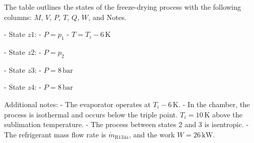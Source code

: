 The table outlines the states of the freeze-drying process with the following columns: \( M \), \( V \), \( P \), \( T \), \( Q \), \( W \), and Notes.  

- State \( z1 \):  
  - \( P = p_1 \)  
  - \( T = T_i - 6 \, \text{K} \)  

- State \( z2 \):  
  - \( P = p_2 \)  

- State \( z3 \):  
  - \( P = 8 \, \text{bar} \)  

- State \( z4 \):  
  - \( P = 8 \, \text{bar} \)  

Additional notes:  
- The evaporator operates at \( T_i - 6 \, \text{K} \).  
- In the chamber, the process is isothermal and occurs below the triple point. \( T_i = 10 \, \text{K} \) above the sublimation temperature.  
- The process between states 2 and 3 is isentropic.  
- The refrigerant mass flow rate is \( \dot{m}_{\text{R134a}} \), and the work \( W = 26 \, \text{kW} \).